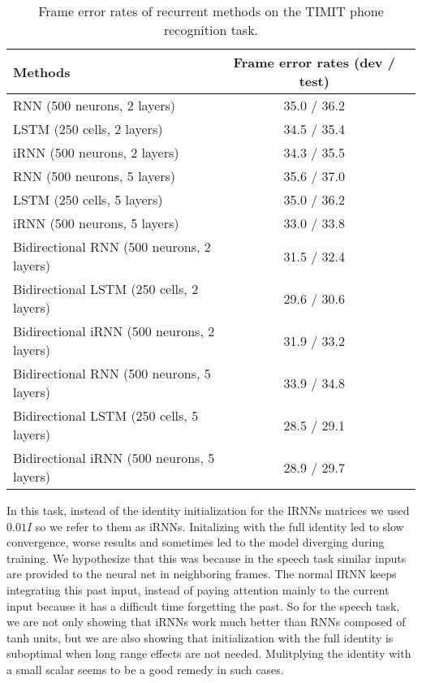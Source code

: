 \documentclass{article} \usepackage{nips14submit_e,times,graphicx}
\begin{document}
\begin{table}[h!]
\centering
\begin{tabular}{|l|c|c|}
\hline {\bf Methods} & {\bf Frame error rates (dev / test) } \\\hline
\hline RNN (500 neurons, 2 layers) & 35.0 / 36.2 \\ LSTM (250 cells, 2
layers) & 34.5 / 35.4 \\ iRNN (500 neurons, 2 layers) & 34.3 / 35.5
\\\hline \hline

RNN (500 neurons, 5 layers)                 &  35.6 / 37.0   \\
LSTM (250 cells, 5 layers)                  &  35.0 / 36.2   \\
iRNN (500 neurons, 5 layers)                &  33.0 / 33.8   \\\hline \hline 

Bidirectional RNN (500 neurons, 2 layers)   &  31.5 / 32.4   \\
Bidirectional LSTM (250 cells, 2 layers)    &  29.6 / 30.6   \\
Bidirectional iRNN (500 neurons, 2 layers)  &  31.9 / 33.2        \\\hline \hline 

Bidirectional RNN (500 neurons, 5 layers)   &  33.9 / 34.8   \\
Bidirectional LSTM (250 cells, 5 layers)    &   28.5 / 29.1  \\
Bidirectional iRNN (500 neurons, 5 layers)  &  28.9 / 29.7   \\\hline 
\end{tabular}
\caption{Frame error rates of recurrent methods on the TIMIT phone
  recognition task.}
\label{tab:speech}
\end{table}

In this task, instead of the identity initialization for the IRNNs
matrices we used $0.01 I$ so we refer to them as iRNNs.  Initalizing
with the full identity led to slow convergence, worse results and
sometimes led to the model diverging during training. We hypothesize
that this was because in the speech task similar inputs are provided
to the neural net in neighboring frames. The normal IRNN keeps
integrating this past input, instead of paying attention mainly to the
current input because it has a difficult time forgetting the past.  So
for the speech task, we are not only showing that iRNNs work much
better than RNNs composed of tanh units, but we are also showing that
initialization with the full identity is suboptimal when long range
effects are not needed. Mulitplying the identity with a small scalar
seems to be a good remedy in such cases.
\end{document}

